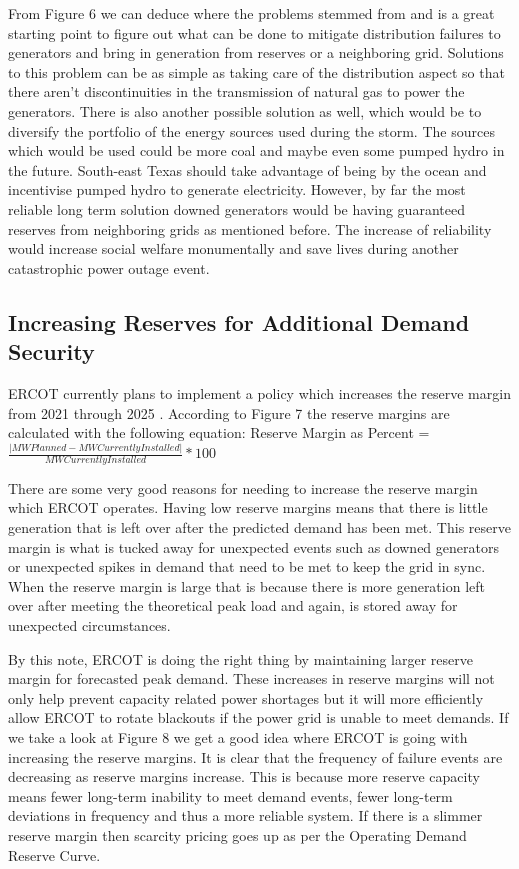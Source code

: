 \documentclass[12pt]{article}
\begin{document}
\noindent From Figure 6 we can deduce where the problems stemmed from and is a great starting point to figure out what can be done to mitigate distribution failures to generators and bring in generation from reserves or a neighboring grid. Solutions to this problem can be as simple as taking care of the distribution aspect so that there aren't discontinuities in the transmission of natural gas to power the generators. There is also another possible solution as well, which would be to diversify the portfolio of the energy sources used during the storm. The sources which would be used could be more coal and maybe even some pumped hydro in the future. South-east Texas should take advantage of being by the ocean and incentivise pumped hydro to generate electricity. However, by far the most reliable long term solution downed generators would be having guaranteed reserves from neighboring grids as mentioned before. The increase of reliability would increase social welfare monumentally and save lives during another catastrophic power outage event. 

\subsection{Increasing Reserves for Additional Demand Security}
\indent
\indent ERCOT currently plans to implement a policy which increases the reserve margin from 2021 through 2025 \cite{ERCOT202-5incReserves}. According to Figure 7 the reserve margins are calculated with the following equation: Reserve Margin as Percent  = $\frac{\lvert MW Planned - MW Currently Installed \rvert}{MW Currently Installed}*100$

\indent There are some very good reasons for needing to increase the reserve margin which ERCOT operates. Having low reserve margins means that there is little generation that is left over after the predicted demand has been met. This reserve margin is what is tucked away for unexpected events such as downed generators or unexpected spikes in demand that need to be met to keep the grid in sync. When the reserve margin is large that is because there is more generation left over after meeting the theoretical peak load and again, is stored away for unexpected circumstances. \par
\indent By this note, ERCOT is doing the right thing by maintaining larger reserve margin for forecasted peak demand. These increases in reserve margins will not only help prevent capacity related power shortages but it will more efficiently allow ERCOT to rotate blackouts if the power grid is unable to meet demands. If we take a look at Figure 8 we get a good idea where ERCOT is going with increasing the reserve margins. It is clear that the frequency of failure events are decreasing as reserve margins increase. This is because more reserve capacity means fewer long-term inability to meet demand events, fewer long-term deviations in frequency and thus a more reliable system. If there is a slimmer reserve margin then scarcity pricing goes up as per the Operating Demand Reserve Curve. 
\end{document}
